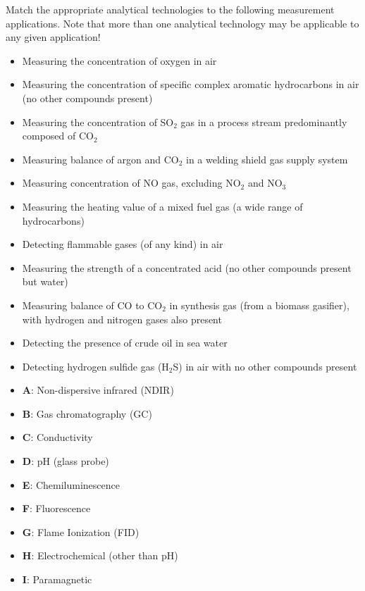 

Match the appropriate analytical technologies to the following measurement applications.  Note that more than one analytical technology may be applicable to any given application!

\begin{itemize}
\item{} \underbar{\hskip 50pt} Measuring the concentration of oxygen in air
\vskip 10pt
\item{} \underbar{\hskip 50pt} Measuring the concentration of specific complex aromatic hydrocarbons in air (no other compounds present)
\vskip 10pt
\item{} \underbar{\hskip 50pt} Measuring the concentration of SO$_{2}$ gas in a process stream predominantly composed of CO$_{2}$
\vskip 10pt
\item{} \underbar{\hskip 50pt} Measuring balance of argon and CO$_{2}$ in a welding shield gas supply system
\vskip 10pt
\item{} \underbar{\hskip 50pt} Measuring concentration of NO gas, excluding NO$_{2}$ and NO$_{3}$
\vskip 10pt
\item{} \underbar{\hskip 50pt} Measuring the heating value of a mixed fuel gas (a wide range of hydrocarbons)
\vskip 10pt
\item{} \underbar{\hskip 50pt} Detecting flammable gases (of any kind) in air
\vskip 10pt
\item{} \underbar{\hskip 50pt} Measuring the strength of a concentrated acid (no other compounds present but water)
\vskip 10pt
\item{} \underbar{\hskip 50pt} Measuring balance of CO to CO$_{2}$ in synthesis gas (from a biomass gasifier), with hydrogen and nitrogen gases also present
\vskip 10pt
\item{} \underbar{\hskip 50pt} Detecting the presence of crude oil in sea water
\vskip 10pt
\item{} \underbar{\hskip 50pt} Detecting hydrogen sulfide gas (H$_{2}$S) in air with no other compounds present
\end{itemize}

\begin{itemize}
\item{} {\bf A}: Non-dispersive infrared (NDIR)
\item{} {\bf B}: Gas chromatography (GC)
\item{} {\bf C}: Conductivity
\item{} {\bf D}: pH (glass probe)
\item{} {\bf E}: Chemiluminescence
\item{} {\bf F}: Fluorescence
\item{} {\bf G}: Flame Ionization (FID)
\item{} {\bf H}: Electrochemical (other than pH)
\item{} {\bf I}: Paramagnetic
\end{itemize}

